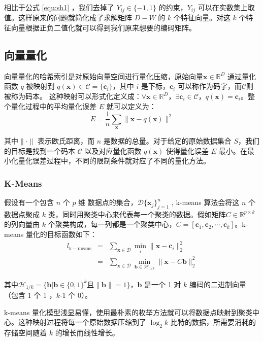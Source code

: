 相比于公式  \ref{equ:sh1} ，我们去掉了 $Y_{ij}\in \{-1,1\}$ 的约束，$Y_{ij}$ 可以在实数集上取值。这样原来的问题就简化成了求解矩阵 $D-W$ 的 $k$ 个特征向量。对这 $k$ 个特征向量根据正负二值化就可以得到我们原来想要的编码矩阵。
\subsection{向量量化}
向量量化的哈希索引是对原始向量空间进行量化压缩，原始向量$\mathbf{x} \in \mathbb{R}^D$ 通过量化函数 $q$ 被映射到 $q(\mathbf{x}) \in \mathcal{C} = \{\mathbf{c}_i\}$，其中 $i$ 是下标，$\mathbf{c}_i$ 可以称作为码字，而$\mathcal{C}$则被称为码本。 这种映射可以形式化定义成：$\forall \mathbf{x} \in \mathbb{R}^D$，$\exists \mathbf{c}_i \in \mathcal{C} $，$q(\mathbf{x})=\mathbf{c}_i$。整个量化过程中的平均量化误差 $E$ 就可以定义为：
\begin{equation}
E = \frac{1}{n}\sum_{\mathbf{x}}\lVert \mathbf{x} - q(\mathbf{x}) \rVert ^2
\end{equation}

其中$\lVert \cdot \rVert$ 表示欧氏距离，而 $n$ 是数据的总量。对于给定的原始数据集合 $S$，我们的目标是找到一个码本 $\mathcal{C}$ 以及对应量化函数 $q(\mathbf{x})$ 使得量化误差 $E$ 最小。在最小化量化误差过程中，不同的限制条件就对应了不同的量化方法。
\subsubsection{K-Means}
假设有一个包含 $n$ 个 $p$ 维 数据点的集合，$\mathcal{D}\{\mathbf{x}_j\}_{j=1}^n$ , k-means 算法会将这 $n$ 个数据点聚成 $k$ 类，同时用聚类中心来代表每一个聚类的数据。假如矩阵$C \in \mathbb{R}^{p\times k}$的列向量由 $k$ 个聚类构成，每一列都是一个聚类中心，$C=[\mathbf{c}_1,\mathbf{c}_2,\cdots, \mathbf{c}_k]$。k-means 量化的目标函数如下：
\begin{eqnarray}
\mathit{l}_\mathrm{k-means} &=&\sum_{\mathbf{x}\in\mathcal{D}}\min_{i}\lVert \mathbf{x} - \mathbf{c}_i \rVert _2^2 \\
                   &=&\sum_{\mathbf{x}\in\mathcal{D}}\min_{\mathbf{b}\in\mathcal{H}_{1/k}}\lVert \mathbf{x} - C\mathbf{b} \rVert _2^2
\end{eqnarray}

其中$\mathcal{H}_{1/k} = \{\mathbf{b}|\mathbf{b}\in\{0,1\}^k$且$\lVert\mathbf{b}\rVert=1\}$，$\mathbf{b}$ 是一个 1 对 $k$ 编码的二进制向量（包含 1 个 1 ，$k$-1 个 0）。

k-means 量化模型浅显易懂，使用最朴素的枚举方法就可以将数据点映射到聚类中心。这种映射过程将每一个原始数据压缩到了 $\log_2k$ 比特的数据，所需要消耗的存储空间随着 $k$ 的增长而线性增长。
